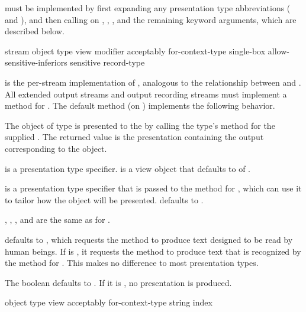  must be implemented by first expanding any presentation type
abbreviations ( and ), and then calling
 on , , , and the remaining
keyword arguments, which are described below.

 {stream object type
                              \key view modifier acceptably for-context-type
                                   single-box allow-sensitive-inferiors sensitive
                                   record-type}

 is the per-stream implementation of , analogous
to the relationship between  and .  All
extended output streams and output recording streams must implement a method for
.  The default method (on
) implements the following behavior.

The object  of type  is presented to the 
 by calling the type's  method for the supplied
 .  The returned value is the presentation containing the
output corresponding to the object.

 is a presentation type specifier.   is a view object that
defaults to  of .

 is a presentation type specifier that is passed to the
 method for , which can use it to tailor how the object
will be presented.   defaults to .

, , , and
 are the same as for .

 defaults to , which requests the  method to
produce text designed to be read by human beings.  If  is
, it requests the  method to produce text that is recognized
by the  method for .  This makes no difference
to most presentation types.

The boolean  defaults to .  If it is , no
presentation is produced.


 {object \optional type
                            \key view acceptably for-context-type string index}

